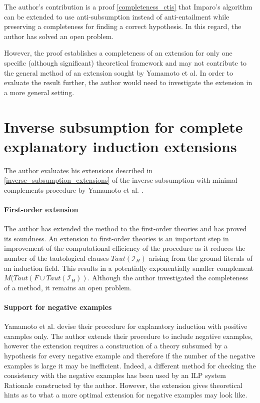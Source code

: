 The author's contribution is a proof \ref{completeness_ctis} that Imparo's algorithm can be extended to use anti-subsumption instead of anti-entailment while preserving a completeness for finding a correct hypothesis. In this regard, the author has solved an open problem.

However, the proof establishes a completeness of an extension for only one specific (although significant) theoretical framework and may not contribute to the general method of an extension sought by Yamamoto et al. In order to evaluate the result further, the author would need to investigate the extension in a more general setting.

\section{Inverse subsumption for complete explanatory induction extensions}
The author evaluates his extensions described in \ref{inverse_subsumption_extensions} of the inverse subsumption with minimal complements procedure by Yamamoto et al. \cite{yamamoto2012inverse}.

\paragraph{First-order extension}\label{evaluation_first_order_extension}
The author has extended the method to the first-order theories and has proved its soundness. An extension to first-order theories is an important step in improvement of the computational efficiency of the procedure as it reduces the number of the tautological clauses $Taut(\mathcal{I}_H)$ arising from the ground literals of an induction field. This results in a potentially exponentially smaller complement $M(Taut(F \cup Taut(\mathcal{I}_H))$. Although the author investigated the completeness of a method, it remains an open problem.

\paragraph{Support for negative examples}
Yamamoto et al. devise their procedure for explanatory induction with positive examples only. The author extends their procedure to include negative examples, however the extension requires a construction of a theory subsumed by a hypothesis for every negative example and therefore if the number of the negative examples is large it may be inefficient. Indeed, a different method for checking the consistency with the negative examples has been used by an ILP system Rationale constructed by the author. However, the extension gives theoretical hints as to what a more optimal extension for negative examples may look like.

